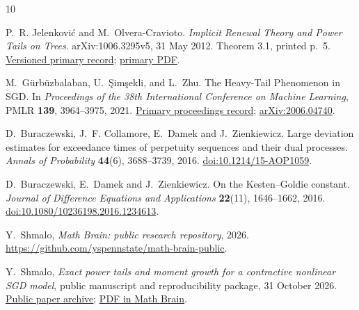 \documentclass[11pt,a4paper]{article}
\numberwithin{equation}{section}
\theoremstyle{remark}
\begin{document}
\begin{thebibliography}{10}
\raggedright
{}

P.~R. Jelenkovi\'c and M.~Olvera-Cravioto.
\emph{Implicit Renewal Theory and Power Tails on Trees}.
arXiv:1006.3295v5, 31 May 2012.
Theorem 3.1, printed p.~5.
\href{https://arxiv.org/abs/1006.3295v5}{Versioned primary record};
\href{https://arxiv.org/pdf/1006.3295}{primary PDF}.

M.~G\"urb\"uzbalaban, U.~\c{S}im\c{s}ekli, and L.~Zhu.
The Heavy-Tail Phenomenon in SGD.
In \emph{Proceedings of the 38th International Conference on Machine
Learning}, PMLR \textbf{139}, 3964--3975, 2021.
\href{https://proceedings.mlr.press/v139/gurbuzbalaban21a.html}
{Primary proceedings record};
\href{https://arxiv.org/abs/2006.04740}{arXiv:2006.04740}.

D.~Buraczewski, J.~F. Collamore, E.~Damek and J.~Zienkiewicz.
Large deviation estimates for exceedance times of perpetuity sequences
and their dual processes. \emph{Annals of Probability}
\textbf{44}(6), 3688--3739, 2016.
\href{https://doi.org/10.1214/15-AOP1059}{doi:10.1214/15-AOP1059}.


D.~Buraczewski, E.~Damek and J.~Zienkiewicz.
On the Kesten--Goldie constant.
\emph{Journal of Difference Equations and Applications}
\textbf{22}(11), 1646--1662, 2016.
\href{https://doi.org/10.1080/10236198.2016.1234613}{doi:10.1080/10236198.2016.1234613}.

Y.~Shmalo, \emph{Math Brain: public research repository}, 2026.
\url{https://github.com/yspennstate/math-brain-public}.

Y.~Shmalo, \emph{Exact power tails and moment growth for a contractive nonlinear SGD model}, public manuscript and reproducibility package, 31 October 2026.
\href{https://github.com/yspennstate/math-brain-public/tree/main/papers/three-targets-2026-10-31/T228}{Public paper archive};
\href{https://github.com/yspennstate/math-brain-public/blob/main/papers/three-targets-2026-10-31/T228/T228_Nonlinear_SGD_Power_Tails.pdf}{PDF in Math Brain}.

\end{thebibliography}
\end{document}
